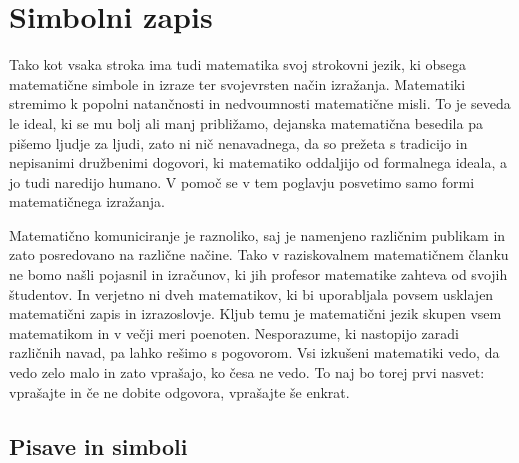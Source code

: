 \chapter{Simbolni zapis}

Tako kot vsaka stroka ima tudi matematika svoj strokovni jezik, ki obsega matematične
simbole in izraze ter svojevrsten način izražanja. Matematiki stremimo k popolni
natančnosti in nedvoumnosti matematične misli. To je seveda le ideal, ki se mu bolj ali
manj približamo, dejanska matematična besedila pa pišemo ljudje za ljudi, zato ni nič
nenavadnega, da so prežeta s tradicijo in nepisanimi družbenimi dogovori, ki matematiko
oddaljijo od formalnega ideala, a jo tudi naredijo humano.
%
V pomoč se v tem poglavju posvetimo samo formi matematičnega izražanja.

Matematično komuniciranje je raznoliko, saj je namenjeno različnim publikam in zato
posredovano na različne načine. Tako v raziskovalnem matematičnem članku ne bomo našli
pojasnil in izračunov, ki jih profesor matematike zahteva od svojih študentov. In verjetno
ni dveh matematikov, ki bi uporabljala povsem usklajen matematični zapis in izrazoslovje.
Kljub temu je matematični jezik skupen vsem matematikom in v večji meri poenoten.
Nesporazume, ki nastopijo zaradi različnih navad, pa lahko rešimo s pogovorom. Vsi
izkušeni matematiki vedo, da vedo zelo malo in zato vprašajo, ko česa ne vedo. To naj bo
torej prvi nasvet: vprašajte in če ne dobite odgovora, vprašajte še enkrat.







\section{Pisave in simboli}
\label{sec:pisave-in-simboli}

